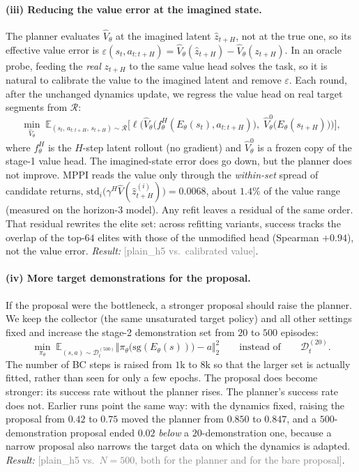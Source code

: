 \documentclass{article} %
\newcommand{\ph}[1]{\textcolor{gray}{#1}}   %
\begin{document}
\paragraph{(iii) Reducing the value error at the imagined state.}
The planner evaluates $\hat V_\theta$ at the imagined latent $\hat z_{t+H}$, not
at the true one, so its effective value error is
$\varepsilon(s_t, a_{t:t+H}) = \hat V_\theta(\hat z_{t+H}) - \hat V_\theta(z_{t+H})$.
In an oracle probe, feeding the \emph{real} $z_{t+H}$ to the same value head solves
the task, so it is natural to calibrate the value to the imagined latent and
remove $\varepsilon$. Each round, after the unchanged dynamics update, we regress
the value head on real target segments from $\mathcal{R}$:
\begin{equation}
\min_{\hat V_\theta}\;
\mathbb{E}_{(s_t,\,a_{t:t+H},\,s_{t+H})\sim\mathcal{R}}
\Big[\ell\Big(\hat V_\theta\big(f^{H}_\theta(E_\theta(s_t), a_{t:t+H})\big),\;
\hat V^{0}_\theta\big(E_\theta(s_{t+H})\big)\Big)\Big],
\end{equation}
where $f^H_\theta$ is the $H$-step latent rollout (no gradient) and
$\hat V^0_\theta$ is a frozen copy of the stage-1 value head. The
imagined-state error does go down, but the planner does not improve. MPPI reads the
value only through the \emph{within-set} spread of candidate returns,
$\mathrm{std}_i\big(\gamma^H \hat V(\hat z^{(i)}_{t+H})\big)=0.0068$, about $1.4\%$
of the value range (measured on the horizon-3 model). Any refit leaves a residual
of the same order. That residual rewrites the elite set: across refitting variants,
success tracks the overlap of the top-$64$ elites with those of the unmodified head
(Spearman $+0.94$), not the value error.
\emph{Result:} \ph{[plain\_h5 vs.\ calibrated value]}.

\paragraph{(iv) More target demonstrations for the proposal.}
If the proposal were the bottleneck, a stronger proposal should raise the planner.
We keep the collector (the same unsaturated target policy) and all other settings
fixed and increase the stage-2 demonstration set from $20$ to $500$ episodes:
\begin{equation}
\min_{\pi_\theta}\;
\mathbb{E}_{(s,a)\sim\mathcal{D}_t^{(500)}}
\big\Vert \pi_\theta\big(\mathrm{sg}(E_\theta(s))\big) - a \big\Vert_2^2
\qquad\text{instead of}\qquad \mathcal{D}_t^{(20)}.
\end{equation}
The number of BC steps is raised from $1$k to $8$k so that the larger set is
actually fitted, rather than seen for only a few epochs. The proposal does become
stronger: its success rate without the planner rises. The planner's success rate
does not. Earlier runs point the same way: with the dynamics fixed, raising the
proposal from $0.42$ to $0.75$ moved the planner from $0.850$ to $0.847$, and a
$500$-demonstration proposal ended $0.02$ \emph{below} a $20$-demonstration one,
because a narrow proposal also narrows the target data on which the dynamics is
adapted. \emph{Result:} \ph{[plain\_h5 vs.\ $N{=}500$, both for the planner and
for the bare proposal]}.
\end{document}
